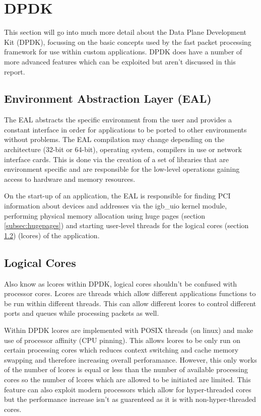 \documentclass[final_report.tex]{subfiles}
\begin{document}
\section{DPDK}
This section will go into much more detail about the Data Plane Development Kit (DPDK), focussing on the basic concepts used by the fast packet processing framework for use within custom applications. DPDK does have a number of more advanced features which can be exploited but aren't discussed in this report. 

\subsection{Environment Abstraction Layer (EAL)}
The EAL abstracts the specific environment from the user and provides a constant interface in order for applications to be ported to other environments without problems. The EAL compilation may change depending on the architecture (32-bit or 64-bit), operating system, compilers in use or network interface cards. This is done via the creation of a set of libraries that are environment specific and are responsible for the low-level operations gaining access to hardware and memory resources.

On the start-up of an application, the EAL is responsible for finding PCI information about devices and addresses via the igb\_uio kernel module, performing physical memory allocation using huge pages (section \ref{subsec:hugepages}) and starting user-level threads for the logical cores (section \ref{subsec:logical_cores}) (lcores) of the application. 

\subsection{Logical Cores}
\label{subsec:logical_cores}
Also know as lcores within DPDK, logical cores shouldn't be confused with processor cores. Lcores are threads which allow different applications functions to be run within different threads. This can allow different lcores to control different ports and queues while processing packets as well.

Within DPDK lcores are implemented with POSIX threads (on linux) and make use of processor affinity (CPU pinning). This allows lcores to be only run on certain processing cores which reduces context switching and cache memory swapping and therefore increasing overall perforamance. However, this only works of the number of lcores is equal or less than the number of available processing cores so the number of lcores which are allowed to be initiated are limited. This feature can also exploit modern processors which allow for hyper-threaded cores but the performance increase isn't as guarenteed as it is with non-hyper-threaded cores.
\end{document}

